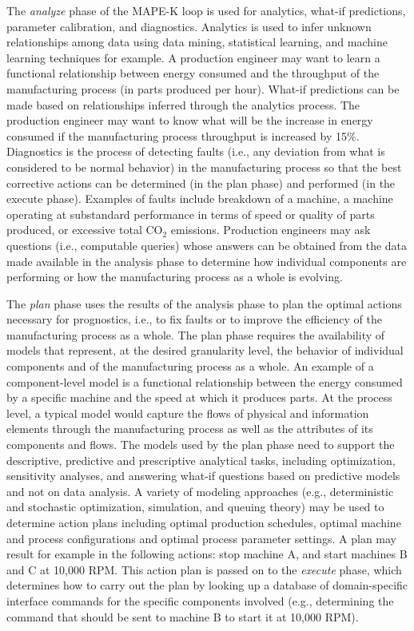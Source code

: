 \documentclass[a4paper, 12pt]{article} %
\begin{document}
The {\em analyze\/} phase of the MAPE-K loop is used for analytics, what-if predictions, parameter calibration, and diagnostics.  Analytics is used to infer unknown relationships among data using data mining, statistical learning, and machine learning techniques for example.  A production engineer may want to learn a functional relationship between energy consumed and the throughput of the manufacturing process (in parts produced per hour). What-if predictions can be made based on relationships inferred through the analytics process.  The production engineer may want to know what will be the increase in energy consumed if the manufacturing process throughput is increased by 15\%.
 Diagnostics is the process of detecting faults (i.e., any deviation from what is considered to be normal behavior) in the manufacturing process so that the best corrective actions can be determined (in the plan phase) and performed (in the execute phase).  Examples of faults include breakdown of a machine, a machine operating at substandard performance in terms of speed or quality of parts produced, or excessive total CO$_2$ emissions. Production engineers may ask questions (i.e., computable queries) whose answers can be obtained from the data made available in the analysis phase to determine how individual components are performing or how the manufacturing process as a whole is evolving.

The {\em plan\/} phase uses the results of the analysis phase  to plan the optimal actions necessary for prognostics, i.e., to fix faults or to improve the efficiency of the manufacturing process as a whole.  The plan phase requires the availability of models that represent, at the desired granularity level, the behavior of individual components and of the manufacturing process as a whole.  An example of a component-level model is a functional relationship between the energy consumed by a specific machine and the speed at which it produces parts.  At the process level, a typical model would capture the flows of physical and information elements through the manufacturing process as well as the attributes of its components and flows. The models used by the plan phase need to support the descriptive, predictive and prescriptive analytical tasks, including optimization, sensitivity analyses, and answering what-if questions based on predictive models and not on data analysis. A variety of modeling approaches (e.g., deterministic and stochastic optimization, simulation, and queuing theory) may be used to determine action plans including optimal production schedules, optimal machine and process configurations and optimal process parameter settings. A plan may result for example in the following actions: stop machine A, and start machines B and C at 10,000 RPM.  This action plan is passed on to the {\em execute\/} phase, which determines how to carry out the plan by looking up a database of domain-specific interface commands for the specific components involved (e.g., determining the command that should be sent to machine B to start it at 10,000 RPM).
\end{document}
